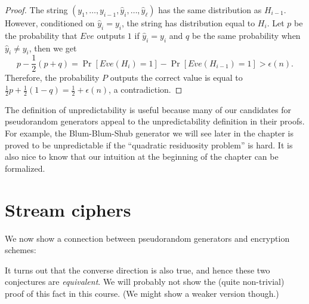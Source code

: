 \begin{proof}
The string \((y_1,\ldots,y_{i-1}, \hat y_i,\ldots,\hat y_\ell)\) has the
same distribution as \(H_{i-1}\). However, conditioned on
\(\hat y_i=y_i\), the string has distribution equal to \(H_{i}\). Let
\(p\) be the probability that \(Eve\) outputs \(1\) if \(\hat y_i=y_i\)
and \(q\) be the same probability when \(\hat y_i\neq y_i\), then we get
\begin{equation*}
p-\frac12(p+q)=\Pr[Eve(H_{i})=1]-\Pr[Eve(H_{i-1})=1]>\epsilon(n).
\end{equation*}
Therefore, the probability \(P\) outputs the correct value is equal to
\(\frac12p+\frac12(1-q)=\frac12+\epsilon(n)\), a contradiction.

\end{proof}

The definition of unpredictability is useful because many of our
candidates for pseudorandom generators appeal to the unpredictability
definition in their proofs. For example, the Blum-Blum-Shub generator we
will see later in the chapter is proved to be unpredictable if the
``quadratic residuosity problem'' is hard. It is also nice to know that
our intuition at the beginning of the chapter can be formalized.

\section{Stream ciphers}\label{3-Stream-ciphers}

We now show a connection between pseudorandom generators and encryption
schemes:

\hypertarget{PRGandcipherthm}{}

It turns out that the converse direction is also true, and hence these
two conjectures are \emph{equivalent}. We will probably not show the
(quite non-trivial) proof of this fact in this course. (We might show a
weaker version though.)

